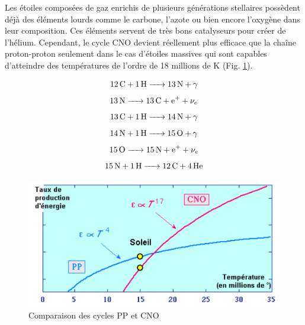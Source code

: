 Les étoiles composées de gaz enrichis de plusieurs générations stellaires possèdent déjà des éléments lourds comme le carbone, l’azote ou bien encore l’oxygène dans leur composition. Ces éléments servent de très bons catalyseurs pour créer de l’hélium. Cependant, le cycle CNO devient réellement plus efficace que la chaîne proton-proton seulement dans le cas d'étoiles massives qui sont capables d'atteindre des températures de l'ordre de 18 millions de K (Fig. \ref{Fig. 2.1}). 


\begin{equation}\ce{\ce{12C} + \ce{1H} -> \ce{13N} +$\gamma$}\label{Eq. 2.4}\end{equation}				     	
\begin{equation}\ce{\ce{13N} -> \ce{13C} + \ce{e+} + $\nu_{e}$ }\label{Eq. 2.5}\end{equation}					   	
\begin{equation}\ce{\ce{13C} + \ce{1H} -> \ce{14N} + $\gamma$ }\label{Eq. 2.6}\end{equation}	
\begin{equation}\ce{\ce{14N} + \ce{1H} -> \ce{15O} + $\gamma$}\label{Eq. 2.7}\end{equation}\newpage\vspace{2cm}		
\begin{equation}\ce{\ce{15O} -> \ce{15N} + \ce{e+} + $\nu_{e}$	}\label{Eq. 2.8}\end{equation}
\begin{equation}\ce{\ce{15N} + \ce{1H} -> \ce{12C} + \ce{4He}}\label{Eq. 2.9}\end{equation}\smallskip

\begin{figure}[H]
	\centering
	\includegraphics[scale=0.8]{images/cno-pp}
	\caption[Comparaison des cycles PP et CNO\newline\url{http://nrumiano.free.fr/Fetoiles/energie.html}]{Comparaison des cycles PP et CNO}
	\label{Fig. 2.1}
\end{figure}\bigskip

